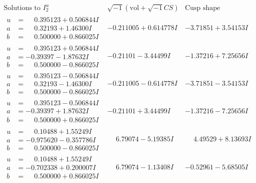 \documentclass[1p]{elsarticle_modified}
\theoremstyle{definition}
\newcommand{\I}{\sqrt{-1}}
\begin{document}
$$\begin{array}{c|c|c}  
\text{Solutions to }I^u_{2}& \I (\text{vol} + \sqrt{-1}CS) & \text{Cusp shape}\\
 \hline 
\begin{aligned}
u &= \phantom{-}0.395123 + 0.506844 I \\
a &= \phantom{-}0.32193 + 1.46300 I \\
b &= \phantom{-}0.500000 + 0.866025 I\end{aligned}
 & -0.211005 + 0.614778 I & -3.71851 + 3.54153 I \\ \hline\begin{aligned}
u &= \phantom{-}0.395123 + 0.506844 I \\
a &= -0.39397 - 1.87632 I \\
b &= \phantom{-}0.500000 - 0.866025 I\end{aligned}
 & -0.21101 - 3.44499 I & -1.37216 + 7.25656 I \\ \hline\begin{aligned}
u &= \phantom{-}0.395123 - 0.506844 I \\
a &= \phantom{-}0.32193 - 1.46300 I \\
b &= \phantom{-}0.500000 - 0.866025 I\end{aligned}
 & -0.211005 - 0.614778 I & -3.71851 - 3.54153 I \\ \hline\begin{aligned}
u &= \phantom{-}0.395123 - 0.506844 I \\
a &= -0.39397 + 1.87632 I \\
b &= \phantom{-}0.500000 + 0.866025 I\end{aligned}
 & -0.21101 + 3.44499 I & -1.37216 - 7.25656 I \\ \hline\begin{aligned}
u &= \phantom{-}0.10488 + 1.55249 I \\
a &= -0.975620 - 0.357786 I \\
b &= \phantom{-}0.500000 - 0.866025 I\end{aligned}
 & \phantom{-}6.79074 - 5.19385 I & \phantom{-}4.49529 + 8.13693 I \\ \hline\begin{aligned}
u &= \phantom{-}0.10488 + 1.55249 I \\
a &= -0.702338 + 0.200007 I \\
b &= \phantom{-}0.500000 + 0.866025 I\end{aligned}
 & \phantom{-}6.79074 - 1.13408 I & -0.52961 - 5.68505 I \\ \hline\begin{aligned}

\end{aligned}
\end{array}$$
\end{document}
